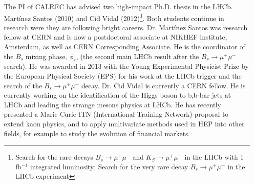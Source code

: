 The PI of CALREC has advised two high-impact Ph.D. thesis in the LHCb. Martínez Santos
(2010) and Cid Vidal (2012)\footnote{Search for the rare decays $B_s \to \mu^+\mu^-$
and $K_S \to \mu^+\mu^-$ in the LHCb with 1 fb$^{-1}$ integrated luminosity; Search for the very rare decay $B_s \to \mu^+\mu^-$ in the LHCb experiment}. Both students continue in research were they are following bright careers.   
Dr. Mart\'inez Santos was research fellow at CERN and is now a postdoctoral associate at NIKHEF institute, Amsterdam, as well as CERN Corresponding Associate. He is the coordinator of the $B_s$ mixing phase, $\phi_s$, (the second main LHCb result after the $B_s \to \mu^+\mu^-$ search). He was awarded in 2013 with the Young Experimental Physicist Prize by the European Physical Society (EPS) for his work at the LHCb trigger and the search of the $B_s \to \mu^+ \mu^-$ decay. Dr. Cid Vidal is currently a CERN fellow. He is currently working on the identification of the Higgs boson to b,b-bar jets at LHCb and leading the strange mesons physics at LHCb. He has recently presented a Marie Curie ITN  (International Training Network) proposal to extend kaon physics, and to apply multivariate methods used in HEP into other fields, for example to study the evolution of financial markets.
 

